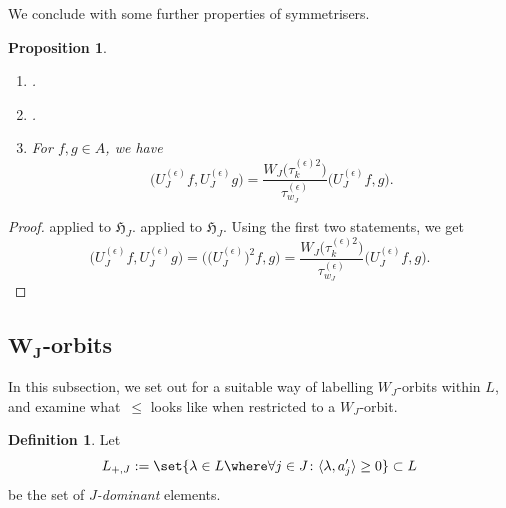 \documentclass[10pt,a4paper]{amsart}
\newtheorem{Proposition}[Theorem]{Proposition}
\theoremstyle{definition}
\newtheorem{Definition}[Theorem]{Definition}
\numberwithin{equation}{section}
\begin{document}
We conclude with some further properties of symmetrisers.
\begin{Proposition}\label{sec:prop-symmetriser-properties}
\qquad
 \begin{enumerate}\itemsep=0pt
 \item[$(i)$] .\vspace{2mm}

 \item[$(ii)$] .
 \item[$(iii)$] For $f,g\in A$, we have
 \[
 \bigl(U^{(\epsilon)}_J f, U^{(\epsilon)}_Jg\bigr)
 = \frac{W_J\bigl(\tau^{(\epsilon)2}_k\bigr)}{\tau^{(\epsilon)}_{w_J}}
 \bigl(U^{(\epsilon)}_J f, g\bigr).
 \]
 \end{enumerate}
\end{Proposition}
\begin{proof} \cite[Section~5.5.17\,(ii)]{macdonald} applied
 to $\mathfrak{H}_J$.
 \cite[Section~5.5.17\,(iii)]{macdonald} applied to
 $\mathfrak{H}_J$.
Using the first two statements, we get
 \[
 \bigl(U^{(\epsilon)}_J f, U^{(\epsilon)}_J g\bigr)
 = \bigl(\bigl(U^{(\epsilon)}_J\bigr)^2 f, g\bigr)
 = \frac{W_J\bigl(\tau^{(\epsilon)2}_k\bigr)}{\tau^{(\epsilon)}_{w_J}}
 \bigl(U^{(\epsilon)}_J f, g\bigr).\tag*{\qed}
 \]
\renewcommand{\qed}{}
\end{proof}

\subsection[W\_J-orbits]{$\boldsymbol{ W_J}$-orbits}
In this subsection, we set out for a suitable way of labelling $W_J$-orbits within
$L$, and examine what~$\le$ looks like when restricted to a $W_J$-orbit.
\begin{Definition}
 Let
 \[
 L_{+,J} := \set{\lambda\in L\where\forall j\in J\colon \langle \lambda, a_j'\rangle\ge0} \subset L
 \]
 be the set of \emph{$J$-dominant} elements.
\end{Definition}
\end{document}

